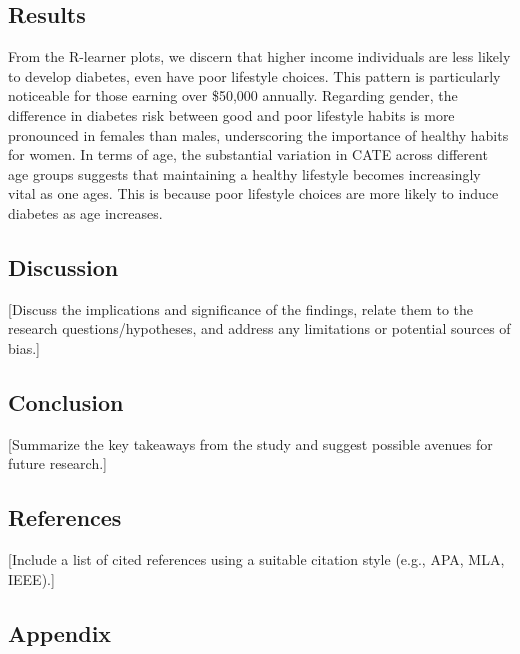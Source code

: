 \documentclass[
  12pt,
]{article}
\begin{document}
\hypertarget{results}{%
\subsection{Results}\label{results}}

From the R-learner plots, we discern that higher income individuals are
less likely to develop diabetes, even have poor lifestyle choices. This
pattern is particularly noticeable for those earning over \$50,000
annually. Regarding gender, the difference in diabetes risk between good
and poor lifestyle habits is more pronounced in females than males,
underscoring the importance of healthy habits for women. In terms of
age, the substantial variation in CATE across different age groups
suggests that maintaining a healthy lifestyle becomes increasingly vital
as one ages. This is because poor lifestyle choices are more likely to
induce diabetes as age increases.

\hypertarget{discussion}{%
\subsection{Discussion}\label{discussion}}

{[}Discuss the implications and significance of the findings, relate
them to the research questions/hypotheses, and address any limitations
or potential sources of bias.{]}

\hypertarget{conclusion}{%
\subsection{Conclusion}\label{conclusion}}

{[}Summarize the key takeaways from the study and suggest possible
avenues for future research.{]}

\hypertarget{references}{%
\subsection{References}\label{references}}

{[}Include a list of cited references using a suitable citation style
(e.g., APA, MLA, IEEE).{]}

\newpage

\hypertarget{appendix}{%
\subsection{Appendix}\label{appendix}}
\end{document}
